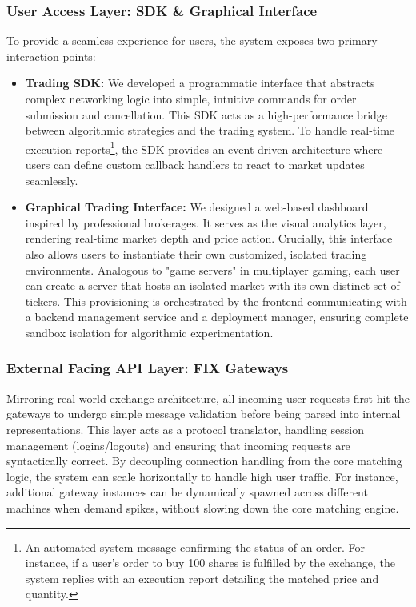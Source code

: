 \documentclass[12pt,a4paper]{article}
\begin{document}
\subsubsection{User Access Layer: SDK \& Graphical Interface}
To provide a seamless experience for users, the system exposes two primary interaction points:
\begin{itemize}
    \item \textbf{Trading SDK:} We developed a programmatic interface that abstracts complex networking logic into simple, intuitive commands for order submission and cancellation. This SDK acts as a high-performance bridge between algorithmic strategies and the trading system. To handle real-time execution reports\footnote{An automated system message confirming the status of an order. For instance, if a user's order to buy 100 shares is fulfilled by the exchange, the system replies with an execution report detailing the matched price and quantity.}, the SDK provides an event-driven architecture where users can define custom callback handlers to react to market updates seamlessly.
    \item \textbf{Graphical Trading Interface:} We designed a web-based dashboard inspired by professional brokerages. It serves as the visual analytics layer, rendering real-time market depth and price action. Crucially, this interface also allows users to instantiate their own customized, isolated trading environments. Analogous to "game servers" in multiplayer gaming, each user can create a server that hosts an isolated market with its own distinct set of tickers. This provisioning is orchestrated by the frontend communicating with a backend management service and a deployment manager, ensuring complete sandbox isolation for algorithmic experimentation.
\end{itemize}

\subsubsection{External Facing API Layer: FIX Gateways}
Mirroring real-world exchange architecture, all incoming user requests first hit the gateways to undergo simple message validation before being parsed into internal representations. This layer acts as a protocol translator, handling session management (logins/logouts) and ensuring that incoming requests are syntactically correct. By decoupling connection handling from the core matching logic, the system can scale horizontally to handle high user traffic. For instance, additional gateway instances can be dynamically spawned across different machines when demand spikes, without slowing down the core matching engine.
\end{document}
